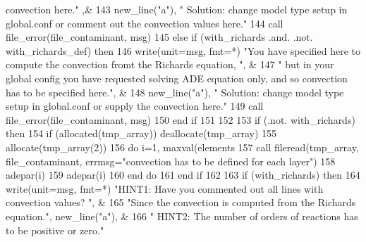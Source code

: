 \begin{DoxyCode}
{{       convection here."}\textcolor{comment}{ ,&}
143 \textcolor{comment}{              new\_line(}\textcolor{stringliteral}{"a"}), \textcolor{stringliteral}{"   Solution: change model type setup in global.conf or comment out the
       convection values here."}
144          \textcolor{keyword}{call }file_error(file_contaminant, msg)
145        \textcolor{keywordflow}{else} \textcolor{keywordflow}{if} (with_richards .and. .not. with\_richards\_def) \textcolor{keywordflow}{then}
146         \textcolor{keyword}{write}(unit=msg, fmt=*) \textcolor{stringliteral}{"You have specified here to compute the convection fromt the Richards
       equation, "}\textcolor{comment}{,  &}
147 \textcolor{comment}{               }\textcolor{stringliteral}{" but in your global config you have requested solving ADE equation only, and so convection
       has to be specified here."}\textcolor{comment}{, &}
148 \textcolor{comment}{         new\_line(}\textcolor{stringliteral}{"a"}),  \textcolor{stringliteral}{"   Solution:  change model type setup in global.conf or supply the convection
       here."}
149          \textcolor{keyword}{call }file_error(file_contaminant, msg)
150 \textcolor{keywordflow}{       end if}
151          
152        
153        \textcolor{keywordflow}{if} (.not. with_richards) \textcolor{keywordflow}{then}
154          \textcolor{keywordflow}{if} (\textcolor{keyword}{allocated}(tmp\_array)) \textcolor{keyword}{deallocate}(tmp\_array)
155          \textcolor{keyword}{allocate}(tmp\_array(2))
156          \textcolor{keywordflow}{do} i=1, maxval(elements%
157            \textcolor{keyword}{call }fileread(tmp\_array, file_contaminant, errmsg=\textcolor{stringliteral}{"convection has to be defined for each layer"}\textcolor{comment}{)}
158 \textcolor{comment}{           adepar(i)%
159 \textcolor{comment}{           adepar(i)%
160 \textcolor{comment}{}\textcolor{keywordflow}{         end do}
161 \textcolor{keywordflow}{      end if}
162       
163       \textcolor{keywordflow}{if} (with_richards) \textcolor{keywordflow}{then}
164         \textcolor{keyword}{write}(unit=msg, fmt=*) \textcolor{stringliteral}{"HINT1: Have you commented out all lines with convection values? "}\textcolor{comment}{, &}
165 \textcolor{comment}{        }\textcolor{stringliteral}{"Since the convection is computed from the Richards equation."}, new\_line\textcolor{comment}{(}\textcolor{stringliteral}{"a"}\textcolor{comment}{), &}
166 \textcolor{comment}{        }\textcolor{stringliteral}{"   HINT2: The number of orders of reactions has to be positive or zero."}
}}}
\end{DoxyCode}
